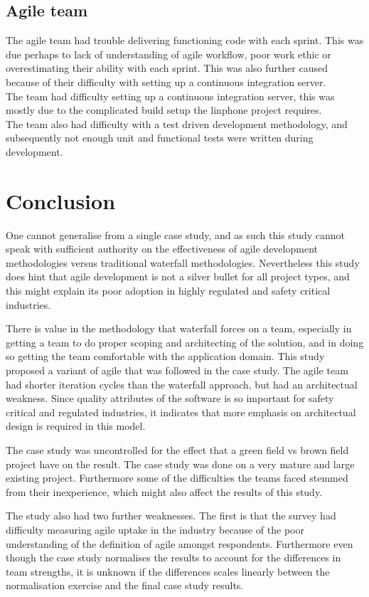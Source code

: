 \documentclass{sig-alternate-05-2015}
\begin{document}
\subsection{Agile team}
The agile team had trouble delivering functioning code with each sprint. This was due perhaps to lack of understanding of agile workflow, poor work ethic or overestimating their ability with each sprint. This was also further caused because of their difficulty with setting up a continuous integration server.
\\
The team had difficulty setting up a continuous integration server, this was mostly due to the complicated build setup the linphone project requires.
\\ 
The team also had difficulty with a test driven development methodology, and subsequently not enough unit and functional tests were written during development.

\section{Conclusion}
One cannot generalise from a single case study, and as such this study cannot speak with sufficient authority on the effectiveness of agile development methodologies versus traditional waterfall methodologies. Nevertheless this study does hint that agile development is not a silver bullet for all project types, and this might explain its poor adoption in highly regulated and safety critical industries. 

There is value in the methodology that waterfall forces on a team, especially in getting a team to do proper scoping and architecting of the solution, and in doing so getting the team comfortable with the application domain. This study proposed a variant of agile that was followed in the case study. The agile team had shorter iteration cycles than the waterfall approach, but had an architectual weakness. Since quality attributes of the software is so important for safety critical and regulated industries, it indicates that more emphasis on architectual design is required in this model. 

The case study was uncontrolled for the effect that a green field vs brown field project have on the result. The case study was done on a very mature and large existing project. Furthermore some of the difficulties the teams faced stemmed from their inexperience, which might also affect the results of this study. 

The study also had two further weaknesses. The first is that the survey had difficulty measuring agile uptake in the industry because of the poor understanding of the definition of agile amongst respondents. Furthermore even though the case study normalises the results to account for the differences in team strengths, it is unknown if the differences scales linearly between the normalisation exercise and the final case study results.  
\end{document}
